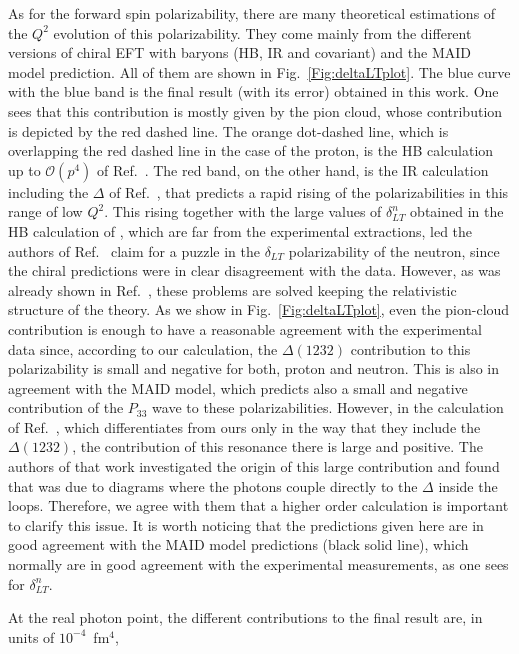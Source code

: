 \documentclass[prc,twocolumn,showpacs,preprintnumbers,amsmath,amssymb
,superscriptaddress,a4paper,nofootinbib
]{revtex4-1}
\begin{document}
As for the forward spin polarizability, there are many theoretical estimations of the $Q^2$ evolution of this polarizability.
They come mainly from the different versions of chiral EFT with baryons (HB, IR and covariant) and the MAID model prediction.
All of them are shown in Fig.~\ref{Fig:deltaLTplot}.
The blue curve with the blue band is the final result (with its error) obtained in this work.
One sees that this contribution is mostly given by the pion cloud, whose contribution is depicted by the red dashed line.
The orange dot-dashed line, which is overlapping the red dashed line in the case of the proton, is the HB calculation up to $\mathcal{O}(p^4)$ of Ref.~\cite{Kao:2002cp}. 
The red band, on the other hand, is the IR calculation including the $\Delta$ of Ref.~\cite{Bernard:2002pw}, that predicts a rapid rising of the polarizabilities in this range of low $Q^2$. 
This rising together with the large values of $\delta_{LT}^n$ obtained in the HB calculation of \cite{Kao:2002cp}, which are far from the experimental extractions, led the authors of Ref.~\cite{Kochelev:2011bh} claim for a puzzle in the $\delta_{LT}$ polarizability of the neutron, since the chiral predictions were in clear disagreement with the data.
However, as was already shown in Ref.~\cite{Bernard:2012hb}, these problems are solved keeping the relativistic structure of the theory.
As we show in Fig.~\ref{Fig:deltaLTplot}, even the pion-cloud contribution is enough to have a reasonable agreement with the experimental data since, according to our calculation, the $\Delta(1232)$ contribution to this polarizability is small and negative for both, proton and neutron. 
This is also in agreement with the MAID model, which predicts also a small and negative contribution of the $P_{33}$ wave to these polarizabilities.
However, in the calculation of Ref.~\cite{Bernard:2012hb}, which differentiates from ours only in the way that they include the $\Delta(1232)$, the contribution of this resonance there is large and positive.
The authors of that work investigated the origin of this large contribution and found that was due to diagrams where the photons couple directly to the $\Delta$ inside the loops. 
Therefore, we agree with them that a higher order calculation is important to clarify this issue.
It is worth noticing that the predictions given here are in good agreement with the MAID model predictions (black solid line), which normally are in good agreement with the experimental measurements, as one sees for $\delta_{LT}^n$.

At the real photon point, the different contributions to the final result are, in units of $10^{-4}$~fm$^4$, 
\end{document}
